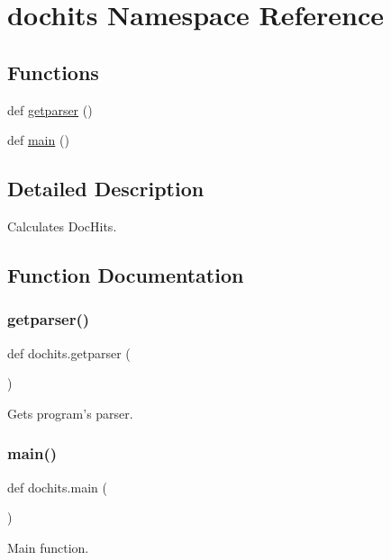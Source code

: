 \hypertarget{namespacedochits}{}\section{dochits Namespace Reference}
\label{namespacedochits}
\subsection*{Functions}
\begin{DoxyCompactItemize}
\item 
def \hyperlink{namespacedochits_ade834b284196c75bb09fae20394d9b16}{getparser} ()
\item 
def \hyperlink{namespacedochits_a85d316ee383431f0b755719be604a23e}{main} ()
\end{DoxyCompactItemize}


\subsection{Detailed Description}
\begin{DoxyVerb}Calculates DocHits.\end{DoxyVerb}
 

\subsection{Function Documentation}
\mbox{\label{namespacedochits_ade834b284196c75bb09fae20394d9b16}} 
\subsubsection{\texorpdfstring{getparser()}{getparser()}}
{\footnotesize\ttfamily def dochits.\+getparser (\begin{DoxyParamCaption}{ }\end{DoxyParamCaption})}

\begin{DoxyVerb}Gets program's parser.\end{DoxyVerb}
 \mbox{\label{namespacedochits_a85d316ee383431f0b755719be604a23e}} 
\subsubsection{\texorpdfstring{main()}{main()}}
{\footnotesize\ttfamily def dochits.\+main (\begin{DoxyParamCaption}{ }\end{DoxyParamCaption})}

\begin{DoxyVerb}Main function.\end{DoxyVerb}
 